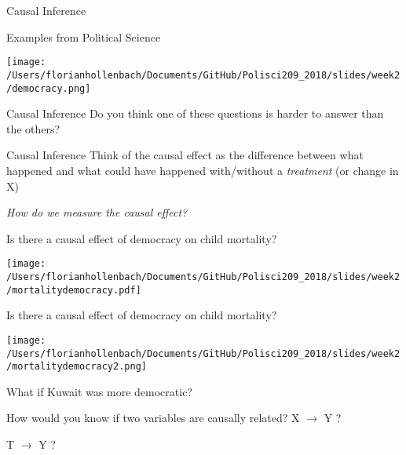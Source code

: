 \documentclass[presentation]{beamer}
\begin{document}
\begin{frame}[label={sec:org791652e}]{Causal Inference}
\begin{block}{Examples from Political Science}
\begin{center}
\texttt{[image: /Users/florianhollenbach/Documents/GitHub/Polisci209\_2018/slides/week2/democracy.png]}
\end{center}
\end{block}
\end{frame}

\begin{frame}[label={sec:org9eb7711}]{Causal Inference}
Do you think one of these questions is harder to answer than the others?
\end{frame}

\begin{frame}[label={sec:orgb1f2eb1}]{Causal Inference}
Think of the causal effect as the difference between what happened and what could have happened with/without a \emph{treatment} (or change in X)

\emph{How do we measure the causal effect?}
\end{frame}

\begin{frame}[label={sec:org60b8f82}]{Is there a causal effect of democracy on child mortality?}
\begin{center}
\texttt{[image: /Users/florianhollenbach/Documents/GitHub/Polisci209\_2018/slides/week2/mortalitydemocracy.pdf]}
\end{center}
\end{frame}

\begin{frame}[label={sec:org5b1ea32}]{Is there a causal effect of democracy on child mortality?}
\begin{center}
\texttt{[image: /Users/florianhollenbach/Documents/GitHub/Polisci209\_2018/slides/week2/mortalitydemocracy2.png]}
\end{center}
\begin{block}{What if Kuwait was more democratic?}
\end{block}
\end{frame}

\begin{frame}[label={sec:orgd1c4bf3}]{How would you know if two variables are causally related?}
\LARGE{X $\rightarrow$ Y ?}

\pause
\LARGE{T $\rightarrow$ Y ?}
\end{frame}
\end{document}
